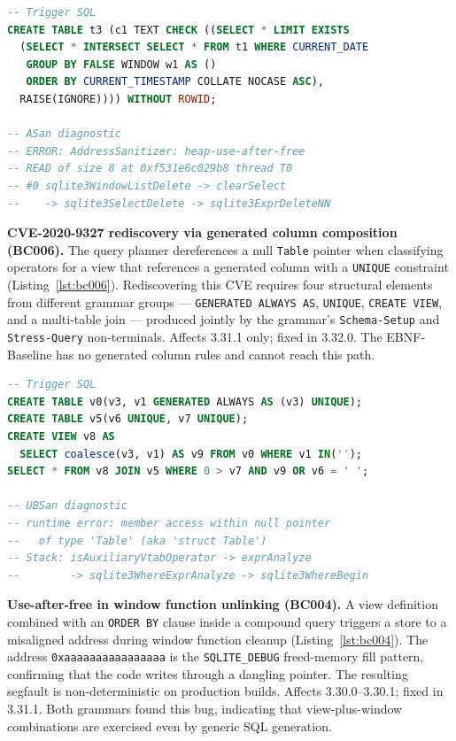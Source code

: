 \begin{lstlisting}[caption={BC011: Heap use-after-free in \texttt{sqlite3WindowListDelete}.},label={lst:bc011},language=SQL,numbers=none]
-- Trigger SQL
CREATE TABLE t3 (c1 TEXT CHECK ((SELECT * LIMIT EXISTS
  (SELECT * INTERSECT SELECT * FROM t1 WHERE CURRENT_DATE
   GROUP BY FALSE WINDOW w1 AS ()
   ORDER BY CURRENT_TIMESTAMP COLLATE NOCASE ASC),
  RAISE(IGNORE)))) WITHOUT ROWID;

-- ASan diagnostic
-- ERROR: AddressSanitizer: heap-use-after-free
-- READ of size 8 at 0xf531e6c029b8 thread T0
-- #0 sqlite3WindowListDelete -> clearSelect
--    -> sqlite3SelectDelete -> sqlite3ExprDeleteNN
\end{lstlisting}

\textbf{CVE-2020-9327 rediscovery via generated column composition (BC006).} The query planner dereferences a null \texttt{Table} pointer when classifying operators for a view that references a generated column with a \texttt{UNIQUE} constraint (Listing~\ref{lst:bc006}). Rediscovering this CVE requires four structural elements from different grammar groups --- \texttt{GENERATED ALWAYS AS}, \texttt{UNIQUE}, \texttt{CREATE VIEW}, and a multi-table join --- produced jointly by the grammar's \texttt{Schema-Setup} and \texttt{Stress-Query} non-terminals. Affects 3.31.1 only; fixed in 3.32.0. The EBNF-Baseline has no generated column rules and cannot reach this path.

\begin{lstlisting}[caption={BC006: Null pointer in \texttt{isAuxiliaryVtabOperator} (CVE-2020-9327).},label={lst:bc006},language=SQL,numbers=none]
-- Trigger SQL
CREATE TABLE v0(v3, v1 GENERATED ALWAYS AS (v3) UNIQUE);
CREATE TABLE v5(v6 UNIQUE, v7 UNIQUE);
CREATE VIEW v8 AS
  SELECT coalesce(v3, v1) AS v9 FROM v0 WHERE v1 IN('');
SELECT * FROM v8 JOIN v5 WHERE 0 > v7 AND v9 OR v6 = ' ';

-- UBSan diagnostic
-- runtime error: member access within null pointer
--   of type 'Table' (aka 'struct Table')
-- Stack: isAuxiliaryVtabOperator -> exprAnalyze
--        -> sqlite3WhereExprAnalyze -> sqlite3WhereBegin
\end{lstlisting}

\textbf{Use-after-free in window function unlinking (BC004).} A view definition combined with an \texttt{ORDER BY} clause inside a compound query triggers a store to a misaligned address during window function cleanup (Listing~\ref{lst:bc004}). The address \texttt{0xaaaaaaaaaaaaaaaa} is the \texttt{SQLITE\_DEBUG} freed-memory fill pattern, confirming that the code writes through a dangling pointer. The resulting segfault is non-deterministic on production builds. Affects 3.30.0--3.30.1; fixed in 3.31.1. Both grammars found this bug, indicating that view-plus-window combinations are exercised even by generic SQL generation.

